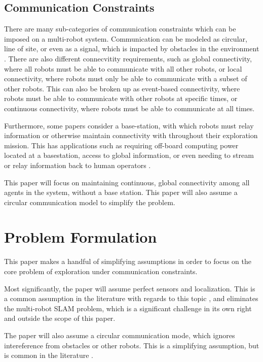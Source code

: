 \documentclass[conference]{IEEEtran}
\begin{document}
\subsection{Communication Constraints}
There are many sub-categories of communication constraints which can be imposed on a multi-robot system.
Communication can be modeled as circular, line of site, or even as a signal, which is impacted by obstacles in the environment \cite{amigoniMultirobotExplorationCommunicationRestricted2017}.
There are also different connecvitity requirements, such as global connectivity, where all robots must be able to communicate with all other robots, or local connectivity, where robots must only be able to communicate with a subset of other robots.
This can also be broken up as event-based connectivity, where robots must be able to communicate with other robots at specific times, or continuous connectivity, where robots must be able to communicate at all times.

Furthermore, some papers consider a base-station, with which robots must relay information or otherwise maintain connectivity with throughout their exploration mission.
This has applications such as requiring off-board computing power located at a basestation, access to global information, or even needing to 
stream or relay information back to human operators \cite{mukhijaTwoPhaseRecursive2010}.

This paper will focus on maintaining continuous, global connectivity among all agents in the system, without a base station. This paper will also assume
a circular communication model to simplify the problem.

\section{Problem Formulation}
This paper makes a handful of simplifying assumptions in order to focus on the core problem of exploration under communication constraints.

Most significantly, the paper will assume perfect sensors and localization. This is a common assumption in the literature with regards to this topic \cite{caregnato-netoRealtimeMotionPlanning2022},
and eliminates the multi-robot SLAM problem, which is a significant challenge in its own right and outside the scope of this paper.

The paper will also assume a circular communication mode, which ignores intereference from obstacles or other robots. 
This is a simplifying assumption, but is common in the literature \cite{amigoniMultirobotExplorationCommunicationRestricted2017}.
\end{document}
